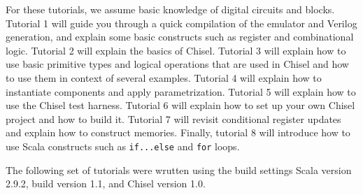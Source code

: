 For these tutorials, we assume basic knowledge of digital circuits and blocks. 
Tutorial 1 will guide you through a quick compilation of the emulator and Verilog generation, and explain some basic constructs such as register and combinational logic.
Tutorial 2 will explain the basics of Chisel.
Tutorial 3 will explain how to use basic primitive types and logical operations that are used in Chisel and how to use them in context of several examples. 
Tutorial 4 will explain how to instantiate components and apply parametrization. 
Tutorial 5 will explain how to use the Chisel test harness. 
Tutorial 6 will explain how to set up your own Chisel project and how to build it.
Tutorial 7 will revisit conditional register updates and explain how to construct memories.
Finally, tutorial 8 will introduce how to use Scala constructs such as \verb+if...else+ and \verb+for+ loops.

The following set of tutorials were wrutten using the build settings Scala version 2.9.2, build version 1.1, and Chisel version 1.0.
